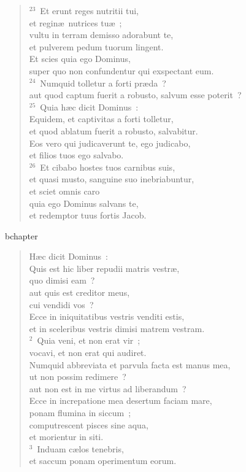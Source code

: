 \begin{verse}
${}^{23}$~Et erunt reges nutritii tui,\\ et regin\ae\ nutrices tu\ae~;\\ vultu in terram demisso adorabunt te,\\ et pulverem pedum tuorum lingent.\\ Et scies quia ego Dominus,\\ super quo non confundentur qui exspectant eum.\\
${}^{24}$~Numquid tolletur a forti pr\ae da~?\\ aut quod captum fuerit a robusto, salvum esse poterit~?\\
${}^{25}$~Quia h\ae c dicit Dominus~:\\ Equidem, et captivitas a forti tolletur,\\ et quod ablatum fuerit a robusto, salvabitur.\\ Eos vero qui judicaverunt te, ego judicabo,\\ et filios tuos ego salvabo.\\
${}^{26}$~Et cibabo hostes tuos carnibus suis,\\ et quasi musto, sanguine suo inebriabuntur,\\ et sciet omnis caro\\ quia ego Dominus salvans te,\\ et redemptor tuus fortis Jacob.\end{verse}


bchapter\begin{verse}\vspace{-19pt}H\ae c dicit Dominus~:\\ Quis est hic liber repudii matris vestr\ae ,\\ quo dimisi eam~?\\ aut quis est creditor meus,\\ cui vendidi vos~?\\ Ecce in iniquitatibus vestris venditi estis,\\ et in sceleribus vestris dimisi matrem vestram.\\
${}^{2}$~Quia veni, et non erat vir~;\\ vocavi, et non erat qui audiret.\\ Numquid abbreviata et parvula facta est manus mea,\\ ut non possim redimere~?\\ aut non est in me virtus ad liberandum~?\\ Ecce in increpatione mea desertum faciam mare,\\ ponam flumina in siccum~;\\ computrescent pisces sine aqua,\\ et morientur in siti.\\
${}^{3}$~Induam c\ae los tenebris,\\ et saccum ponam operimentum eorum.\end{verse}


